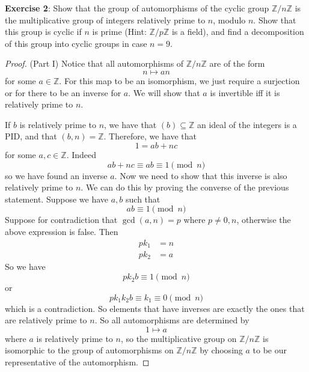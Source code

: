 \documentclass{article}
\begin{document}
\textbf{Exercise 2}: Show that the group of automorphisms of the cyclic group $\mathbb{Z}/n\mathbb{Z}$ is the multiplicative group of integers relatively prime to $n$, modulo $n$. Show that this group is cyclic if $n$ is prime (Hint: $\mathbb{Z}/p\mathbb{Z}$ is a field), and find a decomposition of this group into cyclic groups in case $n = 9$.
    \begin{proof}
        (Part I) Notice that all automorphisms of $\mathbb{Z}/n\mathbb{Z}$ are of the form
            \begin{equation*}
                n \mapsto  an
            \end{equation*}
        for some $a \in \mathbb{Z}$. For this map to be an isomorphism, we just require a surjection or for there to be an inverse for $a$. We will show that $a$ is invertible iff it is relatively prime to $n$.

        If $b$ is relatively prime to $n$, we have that $(b) \subseteq \mathbb{Z}$ an ideal of the integers is a PID, and that $(b, n) = \mathbb{Z}$. Therefore, we have that
            \begin{equation*}
                1 = ab + nc
            \end{equation*}
        for some $a, c \in \mathbb{Z}$. Indeed 
            \begin{equation*}
                ab + nc \equiv ab \equiv 1 \pmod{n}
            \end{equation*}
        so we have found an inverse $a$. Now we need to show that this inverse is also relatively prime to $n$. We can do this by proving the converse of the previous statement. Suppose we have $a, b$ such that
            \begin{equation*}
                ab \equiv 1 \pmod{n}
            \end{equation*}
        Suppose for contradiction that $\gcd(a, n) = p$ where $p \neq 0, n$, otherwise the above expression is false. Then
            \begin{align*}
                pk_{1} &= n \\
                pk_{2} &= a  
            \end{align*}
        So we have 
            \begin{equation*}
                pk_{2}b \equiv 1 \pmod{n}
            \end{equation*}
        or 
            \begin{equation*}
                pk_{1}k_{2}b \equiv k_{1} \equiv 0 \pmod{n}
            \end{equation*}
        which is a contradiction. So elements that have inverses are exactly the ones that are relatively prime to $n$. So all automorphisms are determined by
            \begin{equation*}
                1 \mapsto a
            \end{equation*}
        where $a$ is relatively prime to $n$, so the multiplicative group on $\mathbb{Z}/n\mathbb{Z}$ is isomorphic to the group of automorphisms on $\mathbb{Z}/n\mathbb{Z}$ by choosing $a$ to be our representative of the automorphism.


\end{proof}
\end{document}
